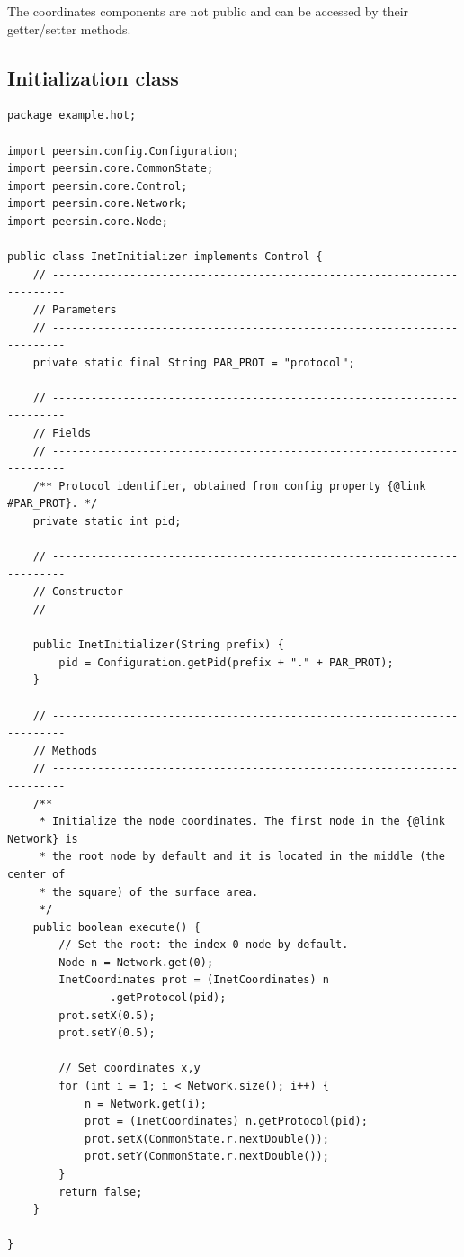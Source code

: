 \documentclass[a4paper,11pt]{article}
\begin{document}
The coordinates components are not public and can be accessed by their
getter/setter methods.

\subsection{Initialization class}
\label{s:init}

\footnotesize
\begin{verbatim}
package example.hot;

import peersim.config.Configuration;
import peersim.core.CommonState;
import peersim.core.Control;
import peersim.core.Network;
import peersim.core.Node;

public class InetInitializer implements Control {
    // ------------------------------------------------------------------------
    // Parameters
    // ------------------------------------------------------------------------
    private static final String PAR_PROT = "protocol";

    // ------------------------------------------------------------------------
    // Fields
    // ------------------------------------------------------------------------
    /** Protocol identifier, obtained from config property {@link #PAR_PROT}. */
    private static int pid;

    // ------------------------------------------------------------------------
    // Constructor
    // ------------------------------------------------------------------------
    public InetInitializer(String prefix) {
        pid = Configuration.getPid(prefix + "." + PAR_PROT);
    }

    // ------------------------------------------------------------------------
    // Methods
    // ------------------------------------------------------------------------
    /**
     * Initialize the node coordinates. The first node in the {@link Network} is
     * the root node by default and it is located in the middle (the center of
     * the square) of the surface area.
     */
    public boolean execute() {
        // Set the root: the index 0 node by default.
        Node n = Network.get(0);
        InetCoordinates prot = (InetCoordinates) n
                .getProtocol(pid);
        prot.setX(0.5);
        prot.setY(0.5);

        // Set coordinates x,y
        for (int i = 1; i < Network.size(); i++) {
            n = Network.get(i);
            prot = (InetCoordinates) n.getProtocol(pid);
            prot.setX(CommonState.r.nextDouble());
            prot.setY(CommonState.r.nextDouble());
        }
        return false;
    }

}
\end{verbatim}
\normalsize
\end{document}
